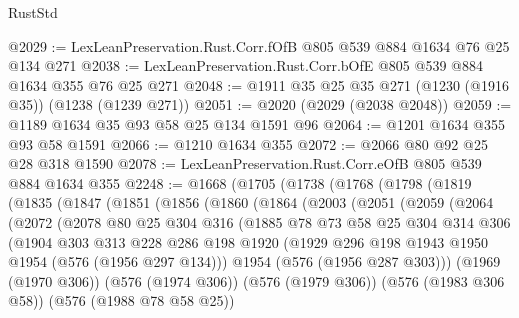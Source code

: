 \begin{lexlean}{RustStd}
\begin{coremodule}
@2029 := LexLeanPreservation.Rust.Corr.fOfB @805 @539 @884 @1634 @76 @25 @134 @271
@2038 := LexLeanPreservation.Rust.Corr.bOfE @805 @539 @884 @1634 @355 @76 @25 @271
@2048 := @1911 @35 @25 @35 @271 (@1230 (@1916 @35)) (@1238 (@1239 @271))
@2051 := @2020 (@2029 (@2038 @2048))
@2059 := @1189 @1634 @35 @93 @58 @25 @134 @1591 @96
@2064 := @1201 @1634 @355 @93 @58 @1591
@2066 := @1210 @1634 @355
@2072 := @2066 @80 @92 @25 @28 @318 @1590
@2078 := LexLeanPreservation.Rust.Corr.eOfB @805 @539 @884 @1634 @355
@2248 := @1668
    (@1705
      (@1738
        (@1768
          (@1798
            (@1819
              (@1835
                (@1847
                  (@1851
                    (@1856
                      (@1860
                        (@1864
                          (@2003
                            (@2051
                              (@2059
                                (@2064
                                  (@2072
                                    (@2078
                                      @80
                                      @25
                                      @304
                                      @316
                                      (@1885
                                        @78
                                        @73
                                        @58
                                        @25
                                        @304
                                        @314
                                        @306
                                        (@1904
                                          @303
                                          @313
                                          @228
                                          @286
                                          @198
                                          @1920
                                          (@1929
                                            @296
                                            @198
                                            @1943
                                            @1950
                                            @1954
                                            (@576 (@1956 @297 @134)))
                                          @1954
                                          (@576 (@1956 @287 @303)))
                                        (@1969 (@1970 @306))
                                        (@576 (@1974 @306))
                                        (@576 (@1979 @306))
                                        (@576 (@1983 @306 @58))
                                        (@576 (@1988 @78 @58 @25))

\end{coremodule}
\end{lexlean}
